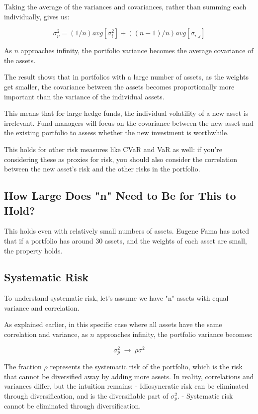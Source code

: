 \documentclass{article}
\begin{document}
Taking the average of the variances and covariances, rather than summing each individually, gives us:

$$
{\sigma}_{p}^{2}=(1/n)avg[{{\sigma}_{i}^{2}}]+((n-1)/n)avg[{\sigma}_{i, j}]
$$

As $n$ approaches infinity, the portfolio variance becomes the average covariance of the assets.

The result shows that in portfolios with a large number of assets, as the weights get smaller, the covariance between the assets becomes proportionally more important than the variance of the individual assets.

This means that for large hedge funds, the individual volatility of a new asset is irrelevant. Fund managers will focus on the covariance between the new asset and the existing portfolio to assess whether the new investment is worthwhile.

This holds for other risk measures like CVaR and VaR as well: if you're considering these as proxies for risk, you should also consider the correlation between the new asset's risk and the other risks in the portfolio.

\subsection{How Large Does "n" Need to Be for This to Hold?}
This holds even with relatively small numbers of assets. Eugene Fama has noted that if a portfolio has around 30 assets, and the weights of each asset are small, the property holds.

\subsection{Systematic Risk}
To understand systematic risk, let's assume we have "n" assets with equal variance and correlation.

As explained earlier, in this specific case where all assets have the same correlation and variance, as $n$ approaches infinity, the portfolio variance becomes:

$$
{\sigma}_{p}^2\hspace{3pt}{\rightarrow}\hspace{3pt}{\rho}{\sigma}^{2}
$$

The fraction ${\rho}$ represents the systematic risk of the portfolio, which is the risk that cannot be diversified away by adding more assets. In reality, correlations and variances differ, but the intuition remains:
- Idiosyncratic risk can be eliminated through diversification, and is the diversifiable part of ${\sigma}_{p}^2$.
- Systematic risk cannot be eliminated through diversification.
\end{document}
